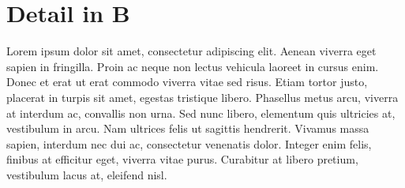 \section{Detail in B}

Lorem ipsum dolor sit amet, consectetur adipiscing elit. Aenean viverra eget sapien in fringilla. Proin ac neque non lectus vehicula laoreet in cursus enim. Donec et erat ut erat commodo viverra vitae sed risus. Etiam tortor justo, placerat in turpis sit amet, egestas tristique libero. Phasellus metus arcu, viverra at interdum ac, convallis non urna. Sed nunc libero, elementum quis ultricies at, vestibulum in arcu. Nam ultrices felis ut sagittis hendrerit. Vivamus massa sapien, interdum nec dui ac, consectetur venenatis dolor. Integer enim felis, finibus at efficitur eget, viverra vitae purus. Curabitur at libero pretium, vestibulum lacus at, eleifend nisl.

